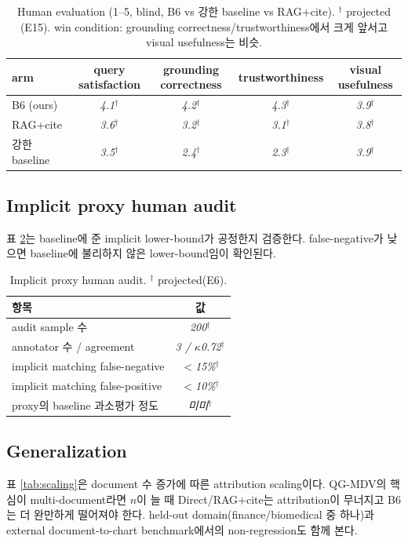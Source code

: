 \documentclass[11pt]{article}
\newcommand{\proj}[1]{\textit{#1}$^\dagger$}
\begin{document}
\begin{table}[h]
\centering\small
\begin{tabular}{lcccc}
\toprule
arm & query satisfaction & grounding correctness & trustworthiness & visual usefulness \\
\midrule
B6 (ours) & \proj{4.1} & \proj{4.2} & \proj{4.3} & \proj{3.9} \\
RAG+cite & \proj{3.6} & \proj{3.2} & \proj{3.1} & \proj{3.8} \\
강한 baseline & \proj{3.5} & \proj{2.4} & \proj{2.3} & \proj{3.9} \\
\bottomrule
\end{tabular}
\caption{Human evaluation (1--5, blind, B6 vs 강한 baseline vs RAG+cite). $^\dagger$ projected
(E15). win condition: grounding correctness/trustworthiness에서 크게 앞서고 visual usefulness는
비슷.}
\label{tab:human}
\end{table}

\subsection{Implicit proxy human audit}
표 \ref{tab:audit}는 baseline에 준 implicit lower-bound가 공정한지 검증한다. false-negative가
낮으면 baseline에 불리하지 않은 lower-bound임이 확인된다.

\begin{table}[h]
\centering\small
\begin{tabular}{lc}
\toprule
항목 & 값 \\
\midrule
audit sample 수 & \proj{200} \\
annotator 수 / agreement & \proj{3 / $\kappa$0.72} \\
implicit matching false-negative & \proj{$<$15\%} \\
implicit matching false-positive & \proj{$<$10\%} \\
proxy의 baseline 과소평가 정도 & \proj{미미} \\
\bottomrule
\end{tabular}
\caption{Implicit proxy human audit. $^\dagger$ projected(E6).}
\label{tab:audit}
\end{table}

\subsection{Generalization}
표 \ref{tab:scaling}은 document 수 증가에 따른 attribution scaling이다. QG-MDV의 핵심이
multi-document라면 $n$이 늘 때 Direct/RAG+cite는 attribution이 무너지고 B6는 더 완만하게 떨어져야
한다. held-out domain(finance/biomedical 중 하나)과 external document-to-chart benchmark에서의
non-regression도 함께 본다.
\end{document}
